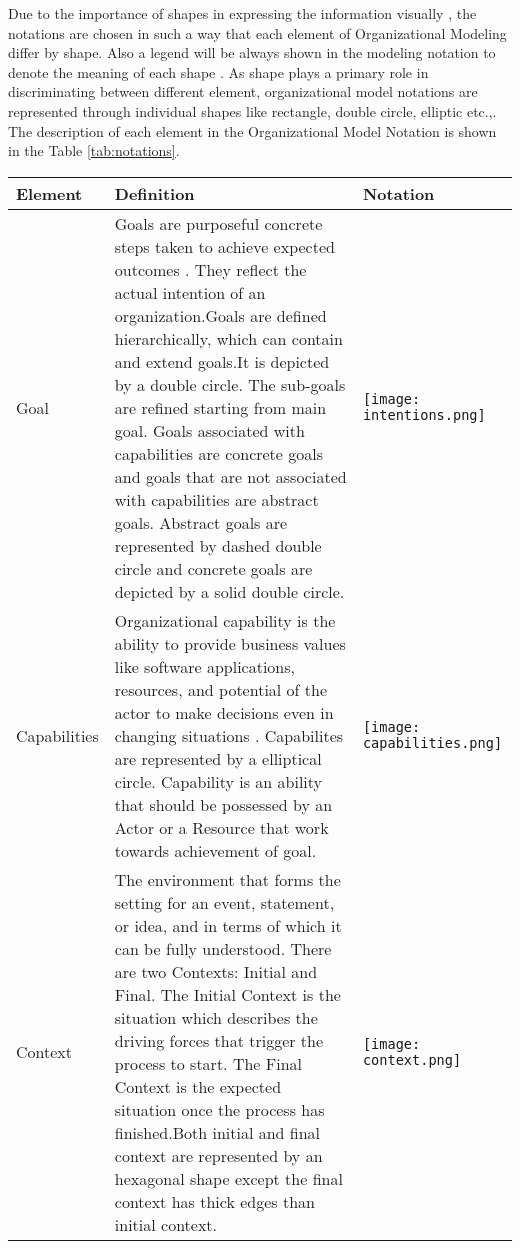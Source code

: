 \hspace{4ex} Due to the importance of shapes in expressing the information visually , the notations are chosen in such a way that each element of Organizational Modeling  differ by shape. Also a legend will be always shown in the modeling notation to denote the meaning of each shape \cite{Moody2009}. As shape plays a primary role in discriminating between different element, organizational model notations are represented through individual shapes like rectangle, double circle, elliptic etc.,. The description of each element in the Organizational Model Notation is shown in the Table \ref{tab:notations}. 

\begin{center}
	\begin{longtable}{p{3cm}p{10cm}p{3cm}}
		\toprule 
		\textbf{Element} & \textbf{Definition} & \textbf{Notation} \\
		\midrule
		\endfirsthead
		Goal 			& Goals are purposeful concrete steps taken to achieve expected outcomes . They reflect the actual intention of an organization.Goals are defined hierarchically, which can contain and extend goals.It is depicted by a double circle. The sub-goals are refined starting from main goal. Goals associated with capabilities are concrete goals and goals that are not associated with capabilities are abstract goals. Abstract goals are represented by dashed double circle and concrete goals are depicted by a solid double circle. & \begin{center} \texttt{[image: intentions.png]}  \end{center}  \\  
		
		Capabilities	& Organizational capability is the ability to provide business values like software applications, resources, and potential of the actor to make decisions even in changing situations \cite{Stirna2012}. Capabilites are represented by a elliptical circle. Capability is an ability that should be possessed by an Actor or a Resource that work towards achievement of goal.   & \begin{center} \texttt{[image: capabilities.png]} \end{center}   \\
		
		Context				& The environment that forms the setting for an event, statement, or idea, and in terms of which it can be fully understood. There are two Contexts: Initial and Final. The Initial Context is the situation which describes the driving forces that trigger the process to start. The Final Context is the expected situation once the process has finished.Both initial and final context are represented by an hexagonal shape except the final context has thick edges than initial context.  & \begin{center} \texttt{[image: context.png]} \end{center}  \\
		

\end{longtable}
\end{center}
